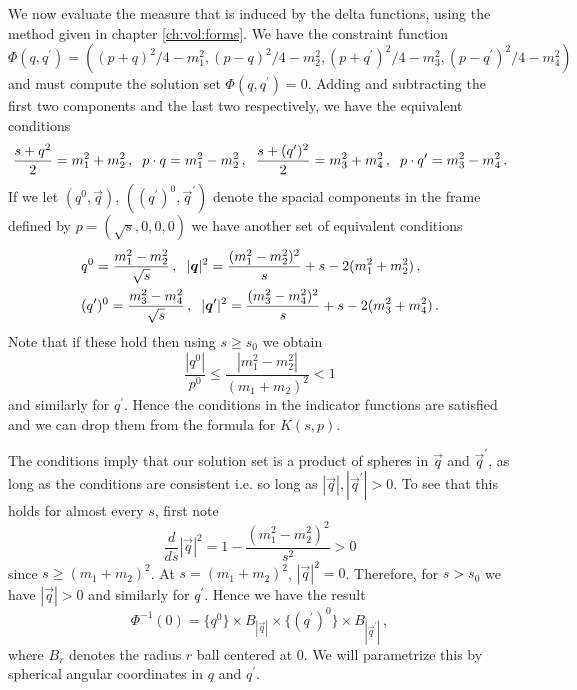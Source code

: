 We now evaluate the measure that is induced by the delta functions, using the method given in chapter \ref{ch:vol:forms}.  We have the constraint function
\begin{equation}
\Phi(q,q^{\prime})=((p+q)^2/4-m_1^2,(p-q)^2/4-m_2^2,(p+q^{\prime})^2/4-m_3^2,(p-q^{\prime})^2/4-m_4^2)
\end{equation}
and must compute the solution set $\Phi(q,q^{\prime})=0$. Adding and subtracting the first two components and the last two respectively, we have the equivalent conditions
\begin{align}
\frac{s+q^2}{2}=m_1^2+m_2^2\,,\hspace{2mm} p\cdot q=m_1^2-m_2^2\,, \hspace{2mm}\frac{s+(q^{\prime})^2}{2}=m_3^2+m_4^2\,,\hspace{2mm} p\cdot q^{\prime}=m_3^2-m_4^2\,.
\end{align}
If we let $(q^0,\vec{q})$, $((q^{\prime})^0,\vec{q}^{\prime})$ denote the spacial components in the frame defined by $p=(\sqrt{s},0,0,0)$ we have another set of equivalent conditions
\begin{align}\label{coordConditions}
&q^{0}=\frac{m_1^2-m_2^2}{\sqrt{s}}\,,\hspace{2mm} |\vec{q}|^2=\frac{(m_1^2-m_2^2)^2}{s}+s-2(m_1^2+m_2^2)\,,\\
&(q^{\prime})^{0}=\frac{m_3^2-m_4^2}{\sqrt{s}}\,, \hspace{2mm} |\vec{q}^{\prime}|^2=\frac{(m_3^2-m_4^2)^2}{s}+s-2(m_3^2+m_4^2)\,.\notag
\end{align}
Note that if these hold then using $s\geq s_0$ we obtain
\begin{equation}
\frac{|q^0|}{p^0}\leq \frac{|m_1^2-m_2^2|}{(m_1+m_2)^2}<1
\end{equation}
and similarly for $q^{\prime}$.  Hence the conditions in the indicator functions are satisfied and we can drop them from the formula for $K(s,p)$.

The conditions  imply that our solution set is a product of spheres in $\vec{q}$ and $\vec{q}^{\prime}$, as long as the conditions are consistent i.e. so long as $|\vec{q}|,|\vec{q}^{\prime}|>0$. To see that this holds for almost every $s$, first note
\begin{equation}
\frac{d}{ds}|\vec{q}|^2=1-\frac{(m_1^2-m_2^2)^2}{s^2}>0
\end{equation}
since $s\geq (m_1+m_2)^2$.  At $s=(m_1+m_2)^2$, $|\vec{q}|^2=0$.  Therefore, for $s>s_0$ we have $|\vec{q}|>0$ and similarly for $q^{\prime}$.  Hence we have the result
\begin{equation}
\Phi^{-1}(0)=\{q^{0}\}\times B_{|\vec{q}|}\times \{(q^{\prime})^{0}\}\times B_{|\vec{q}^{\prime}|}\,,
\end{equation}
where $B_r$ denotes the radius $r$ ball centered at $0$.  We will parametrize this by spherical angular coordinates in $q$ and $q^{\prime}$. 

